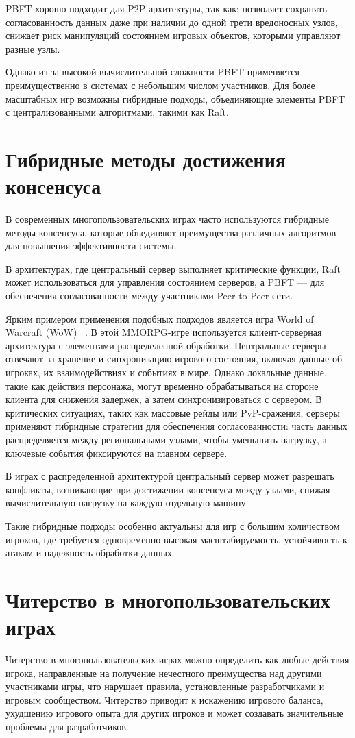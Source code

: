 PBFT хорошо подходит для P2P-архитектуры, так как: позволяет сохранять согласованность данных даже при наличии до одной трети вредоносных узлов, снижает риск манипуляций состоянием игровых объектов, которыми управляют разные узлы.

Однако из-за высокой вычислительной сложности PBFT применяется преимущественно в системах с небольшим числом участников. Для более масштабных игр возможны гибридные подходы, объединяющие элементы PBFT с централизованными алгоритмами, такими как Raft.

\chapter{Гибридные методы достижения консенсуса}
В современных многопользовательских играх часто используются гибридные методы консенсуса, которые объединяют преимущества различных алгоритмов для повышения эффективности системы. 

В архитектурах, где центральный сервер выполняет критические функции, Raft может использоваться для управления состоянием серверов, а PBFT — для обеспечения согласованности между участниками Peer-to-Peer сети.

Ярким примером применения подобных подходов является игра World of Warcraft (WoW) ~\cite{b8}. В этой MMORPG-игре используется клиент-серверная архитектура с элементами распределенной обработки. Центральные серверы отвечают за хранение и синхронизацию игрового состояния, включая данные об игроках, их взаимодействиях и событиях в мире. Однако локальные данные, такие как действия персонажа, могут временно обрабатываться на стороне клиента для снижения задержек, а затем синхронизироваться с сервером. В критических ситуациях, таких как массовые рейды или PvP-сражения, серверы применяют гибридные стратегии для обеспечения согласованности: часть данных распределяется между региональными узлами, чтобы уменьшить нагрузку, а ключевые события фиксируются на главном сервере.

В играх с распределенной архитектурой центральный сервер может разрешать конфликты, возникающие при достижении консенсуса между узлами, снижая вычислительную нагрузку на каждую отдельную машину.

Такие гибридные подходы особенно актуальны для игр с большим количеством игроков, где требуется одновременно высокая масштабируемость, устойчивость к атакам и надежность обработки данных.

\chapter{Читерство в многопользовательских играх}
Читерство в многопользовательских играх можно определить как любые действия игрока, направленные на получение нечестного преимущества над другими участниками игры, что нарушает правила, установленные разработчиками и игровым сообществом. Читерство приводит к искажению игрового баланса, ухудшению игрового опыта для других игроков и может создавать значительные проблемы для разработчиков.

